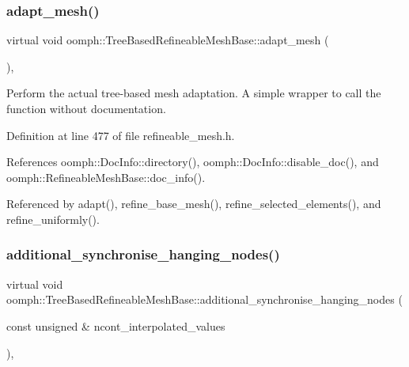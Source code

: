 \mbox{\label{classoomph_1_1TreeBasedRefineableMeshBase_a64608ddedb7eb56e11bee2805aa01360}} 
\subsubsection{\texorpdfstring{adapt\+\_\+mesh()}{adapt\_mesh()}\hspace{0.1cm}{\footnotesize\ttfamily [2/2]}}
{\footnotesize\ttfamily virtual void oomph\+::\+Tree\+Based\+Refineable\+Mesh\+Base\+::adapt\+\_\+mesh (\begin{DoxyParamCaption}{ }\end{DoxyParamCaption})\hspace{0.3cm}{\ttfamily [inline]}, {\ttfamily [virtual]}}



Perform the actual tree-\/based mesh adaptation. A simple wrapper to call the function without documentation. 



Definition at line 477 of file refineable\+\_\+mesh.\+h.



References oomph\+::\+Doc\+Info\+::directory(), oomph\+::\+Doc\+Info\+::disable\+\_\+doc(), and oomph\+::\+Refineable\+Mesh\+Base\+::doc\+\_\+info().



Referenced by adapt(), refine\+\_\+base\+\_\+mesh(), refine\+\_\+selected\+\_\+elements(), and refine\+\_\+uniformly().

\mbox{\label{classoomph_1_1TreeBasedRefineableMeshBase_a59d0404f8e5ebd7199f25c794c5c715c}} 
\subsubsection{\texorpdfstring{additional\+\_\+synchronise\+\_\+hanging\+\_\+nodes()}{additional\_synchronise\_hanging\_nodes()}}
{\footnotesize\ttfamily virtual void oomph\+::\+Tree\+Based\+Refineable\+Mesh\+Base\+::additional\+\_\+synchronise\+\_\+hanging\+\_\+nodes (\begin{DoxyParamCaption}\item[{const unsigned \&}]{ncont\+\_\+interpolated\+\_\+values }\end{DoxyParamCaption})\hspace{0.3cm}{\ttfamily [protected]}, {}}

